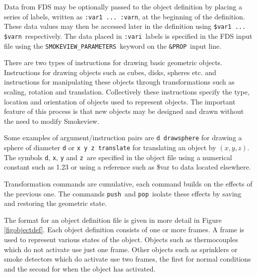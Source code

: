\documentclass[11pt,twoside]{book}
\begin{document}
Data from FDS may be optionally passed to the object definition by placing a series of labels, written as {\tt :var1 ... :varn}, at the beginning of the definition.  These data values may then be accessed later in the definition using {\tt \$var1 ... \$varn}\ respectively. The data placed in {\tt :vari}\ labels is specified in the FDS input  file using the {\tt SMOKEVIEW\_PARAMETERS}\ keyword on the {\tt \&PROP}\ input line.

There are two types of instructions for drawing basic geometric objects.  Instructions for drawing objects such as cubes, disks, spheres etc.  and instructions for manipulating these objects through transformations such as scaling, rotation and translation. Collectively these instructions specify the type, location and orientation of objects used to represent objects.  The important feature of this process is that new objects may be designed and drawn without the need to modify Smokeview.

Some examples of argument/instruction pairs are {\tt d drawsphere} for drawing a sphere of diameter {\tt d} or {\tt x y z translate} for
translating an object by $(x,y,z)$. The symbols {\tt d}, {\tt x}, {\tt y} and {\tt z}\ are specified in the object file using a numerical constant such as 1.23 or using a reference such as \$var to data located elsewhere.

Transformation commands are cumulative, each command builds on the effects of the previous one.  The commands {\tt push}\ and {\tt pop}\ isolate these effects by saving and restoring the geometric state.

The format for an object definition file is given in more detail in Figure \ref{figobjectdef}.  Each object definition consists of one or more frames.  A frame is used to represent various states of the object. Objects such as thermocouples which do not activate use just one frame. Other objects such as sprinklers or smoke detectors which do activate use two frames, the first for normal conditions and the second for when the object has activated.
\end{document}
